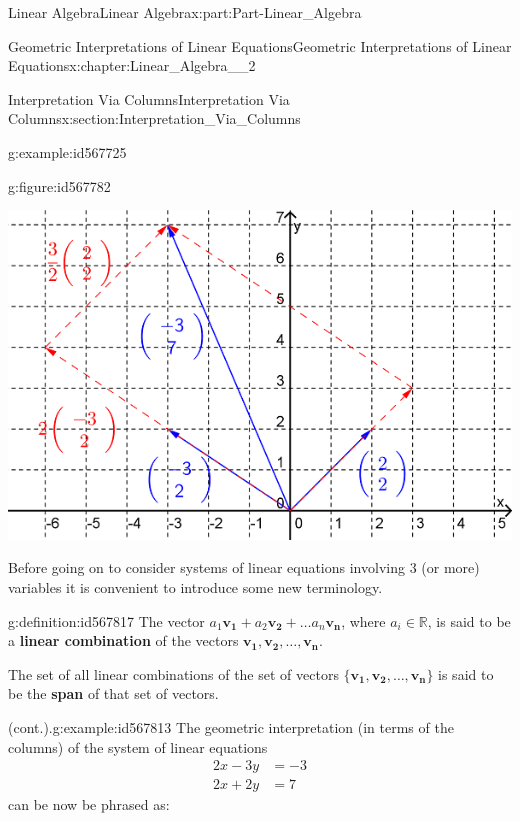 \documentclass[oneside,10pt,]{book}
\newcommand{\terminology}[1]{\textbf{#1}}
\numberwithin{equation}{section}
\newcommand{\amp}{&}
\begin{document}
\begin{partptx}{Linear Algebra}{}{Linear Algebra}{}{}{x:part:Part-Linear_Algebra}
\begin{chapterptx}{Geometric Interpretations of Linear Equations}{}{Geometric Interpretations of Linear Equations}{}{}{x:chapter:Linear_Algebra__2}
\begin{sectionptx}{Interpretation Via Columns}{}{Interpretation Via Columns}{}{}{x:section:Interpretation_Via_Columns}
\begin{example}{}{g:example:id567725}
\begin{figureptx}{}{g:figure:id567782}{}
\begin{image}{0.2}{0.6}{0.2}
\includegraphics[width=\linewidth]{./LinearAlgebra/Images/2/figure4.png}
\end{image}%
\tcblower
\end{figureptx}%
%
\end{example}
Before going on to consider systems of linear equations involving \(3\) (or more) variables it is convenient to introduce some new terminology.%
\begin{definition}{}{g:definition:id567817}%
The vector \(a_1\mathbf{v_1}+a_2\mathbf{v_2}+\dots a_n\mathbf{v_n}\), where \(a_i\in \mathbb{R}\), is said to be a \terminology{linear combination} of the vectors \(\mathbf{v_1}, \mathbf{v_2}, \dots, \mathbf{v_n}\).%
\par
The set of all linear combinations of the set of vectors \(\{\mathbf{v_1}, \mathbf{v_2}, \dots, \mathbf{v_n}\}\)  is said to be the \terminology{span} of that set of vectors.%
\end{definition}
\begin{example}{(cont.).}{g:example:id567813}%
The geometric interpretation (in terms of the columns) of the system of linear equations%
\begin{align*}
2x-3y \amp =-3\\
2x+2y \amp = 7
\end{align*}
can be now be phrased as:%
\begin{itemize}[label=\textbullet]

\end{itemize}
\end{example}
\end{sectionptx}
\end{chapterptx}
\end{partptx}
\end{document}
